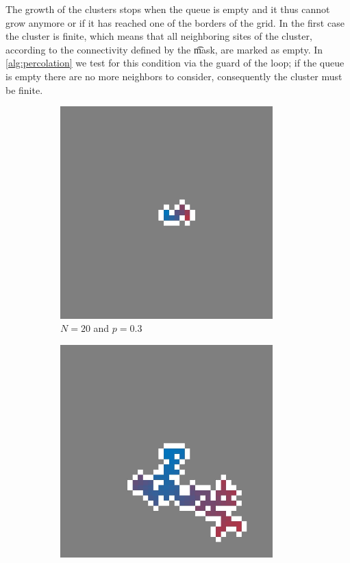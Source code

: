 The growth of the clusters stops when the queue is empty and it thus cannot grow anymore or if it has reached one of the borders of the grid. In the first case the cluster is finite, which means that all neighboring sites of the cluster, according to the connectivity defined by the \t{mask}, are marked as empty. In \cref{alg:percolation} we test for this condition via the guard of the loop; if the queue is empty there are no more neighbors to consider, consequently the cluster must be finite. 

\begin{figure}
	\centering	
	\begin{subfigure}{0.27\textwidth}
		\centering
		\includegraphics[width=0.9\textwidth]{./img/fancy_cluster_N20_p3_rng_8}
		\caption{$N = 20$ and $p = 0.3$}
		\label{fig:method:fin_inf:finiteSmall}
	\end{subfigure}
	\begin{subfigure}{0.27\textwidth}
		\centering
		\includegraphics[width=0.9\textwidth]{./img/fancy_cluster_N20_p5_rng_8}

\end{subfigure}
\end{figure}
